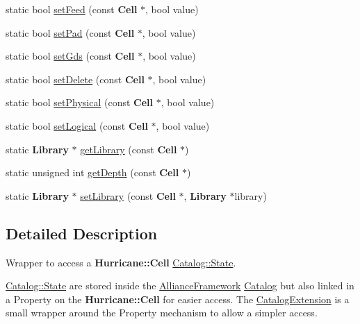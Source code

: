 \begin{DoxyCompactItemize}
\item 
static bool \hyperlink{classCRL_1_1CatalogExtension_ab82e4b139ca636feaca5d97836891b68}{set\-Feed} (const {\bf Cell} $\ast$, bool value)
\item 
static bool \hyperlink{classCRL_1_1CatalogExtension_afceda0d184ed2964e160b563a216bc35}{set\-Pad} (const {\bf Cell} $\ast$, bool value)
\item 
static bool \hyperlink{classCRL_1_1CatalogExtension_a6c440bfd5ac56c9e07213c1347f0610a}{set\-Gds} (const {\bf Cell} $\ast$, bool value)
\item 
static bool \hyperlink{classCRL_1_1CatalogExtension_a8a5bdbfb8c898f8ea00c8718c6714983}{set\-Delete} (const {\bf Cell} $\ast$, bool value)
\item 
static bool \hyperlink{classCRL_1_1CatalogExtension_ae3de9795e0ddce5a767cf53d79fec077}{set\-Physical} (const {\bf Cell} $\ast$, bool value)
\item 
static bool \hyperlink{classCRL_1_1CatalogExtension_a9609c756887f433fe9b250e32ff1ae0a}{set\-Logical} (const {\bf Cell} $\ast$, bool value)
\item 
static {\bf Library} $\ast$ \hyperlink{classCRL_1_1CatalogExtension_a6681f9fbe64998a27fe532fd3591afc7}{get\-Library} (const {\bf Cell} $\ast$)
\item 
static unsigned int \hyperlink{classCRL_1_1CatalogExtension_ae4f8d30cf08796b62422546c05526d86}{get\-Depth} (const {\bf Cell} $\ast$)
\item 
static {\bf Library} $\ast$ \hyperlink{classCRL_1_1CatalogExtension_a6ef1b96f9bbbe39e13a5aba073f2394c}{set\-Library} (const {\bf Cell} $\ast$, {\bf Library} $\ast$library)
\end{DoxyCompactItemize}


\subsection{Detailed Description}
Wrapper to access a {\bf Hurricane\-::\-Cell} \hyperlink{classCRL_1_1Catalog_1_1State}{Catalog\-::\-State}. 

\hyperlink{classCRL_1_1Catalog_1_1State}{Catalog\-::\-State} are stored inside the \hyperlink{classCRL_1_1AllianceFramework}{Alliance\-Framework} \hyperlink{classCRL_1_1Catalog}{Catalog} but also linked in a Property on the {\bf Hurricane\-::\-Cell} for easier access. The \hyperlink{classCRL_1_1CatalogExtension}{Catalog\-Extension} is a small wrapper around the Property mechanism to allow a simpler access. 

